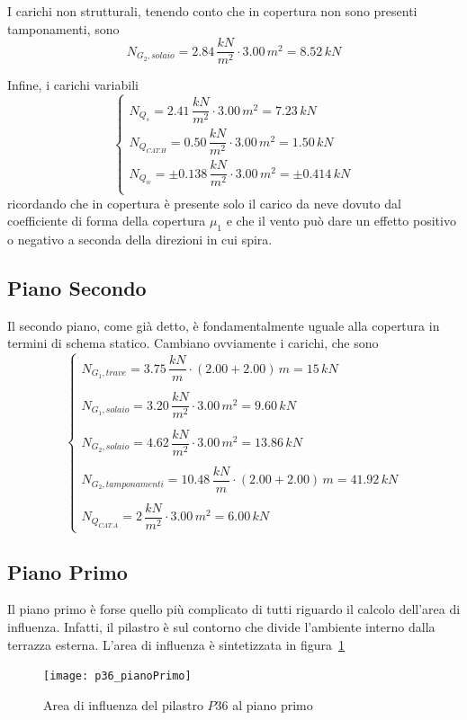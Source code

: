 I carichi non strutturali, tenendo conto che in copertura non sono presenti tamponamenti, sono
\[
		N_{G_2, solaio} = 2.84\,\dfrac{kN}{m^2}\cdot 3.00\,m^2 = 8.52\,kN
\]

Infine, i carichi variabili
\[
	\begin{cases}
		N_{Q_s} = 2.41\,\dfrac{kN}{m^2}\cdot 3.00\,m^2 = 7.23\,kN\\
		N_{Q_{CAT. H}} = 0.50\,\dfrac{kN}{m^2}\cdot 3.00\,m^2 = 1.50\,kN\\
		N_{Q_w} = \pm 0.138\,\dfrac{kN}{m^2}\cdot 3.00\,m^2 = \pm 0.414\,kN\\
	\end{cases}
\]
ricordando che in copertura è presente solo il carico da neve dovuto dal coefficiente di forma della copertura $\mu_1$ e che il vento può dare un effetto positivo o negativo a seconda della direzioni in cui spira.

\subsection{Piano Secondo}
Il secondo piano, come già detto, è fondamentalmente uguale alla copertura in termini di schema statico. Cambiano ovviamente i carichi, che sono
\[
	\begin{cases}
		N_{G_1, trave} = 3.75\,\dfrac{kN}{m}\cdot (2.00 + 2.00)\,m = 15\,kN\\\\
		N_{G_1, solaio} = 3.20\,\dfrac{kN}{m^2} \cdot 3.00\,m^2 = 9.60\,kN\\\\
		N_{G_2, solaio} = 4.62\,\dfrac{kN}{m^2} \cdot 3.00\,m^2 = 13.86\,kN\\\\
		N_{G_2, tamponamenti} = 10.48\,\dfrac{kN}{m} \cdot (2.00 + 2.00)\,m = 41.92\,kN\\\\
		N_{Q_{CAT.A}} = 2\,\dfrac{kN}{m^2} \cdot 3.00\,m^2 = 6.00\,kN
	\end{cases}
\]

\subsection{Piano Primo}
Il piano primo è forse quello più complicato di tutti riguardo il calcolo dell'area di influenza. Infatti, il pilastro è sul contorno che divide l'ambiente interno dalla terrazza esterna. L'area di influenza è sintetizzata in figura~\ref{fig:p36infAreaPianoPrimo}

\begin{figure}
	\centering
	\texttt{[image: p36\_pianoPrimo]}
	\caption{Area di influenza del pilastro $P36$ al piano primo}
	\label{fig:p36infAreaPianoPrimo}
\end{figure}

